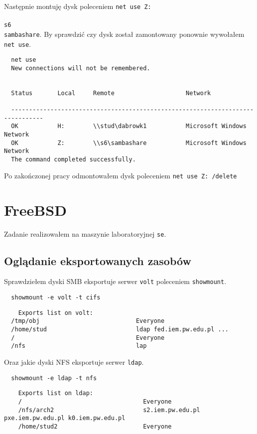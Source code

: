 \documentclass{article} %
\begin{document}
Następnie montuję dysk poleceniem \texttt{net use Z: \\\\s6\\sambashare}.
By sprawdzić czy dysk został zamontowany ponownie wywołałem \texttt{net use}.
\begin{verbatim}
  net use
  New connections will not be remembered.


  Status       Local     Remote                    Network

  -------------------------------------------------------------------------------
  OK           H:        \\stud\dabrowk1           Microsoft Windows Network
  OK           Z:        \\s6\sambashare           Microsoft Windows Network
  The command completed successfully.
\end{verbatim}

Po zakończonej pracy odmontowałem dysk poleceniem \texttt{net use Z: /delete}

\section{FreeBSD}
Zadanie realizowałem na maszynie laboratoryjnej \texttt{se}.

\subsection{Oglądanie eksportowanych zasobów}
Sprawdziełem dyski SMB eksportuje serwer \texttt{volt} poleceniem \texttt{showmount}.

\begin{tcolorbox}[colback=yellow!10!white,colframe=red!45!black,coltitle=yellow!100!black, title=FreeBSD]
  \begin{lstlisting}
  showmount -e volt -t cifs
  \end{lstlisting}
  \tcblower
  \tiny
  \begin{lstlisting}
    Exports list on volt:
  /tmp/obj                           Everyone
  /home/stud                         ldap fed.iem.pw.edu.pl ...
  /                                  Everyone
  /nfs                               lap
  \end{lstlisting}
\end{tcolorbox}
\normalsize

\vspace{1cm}
Oraz jakie dyski NFS eksportuje serwer \texttt{ldap}.
\begin{tcolorbox}[colback=yellow!10!white,colframe=red!45!black,coltitle=yellow!100!black, title=FreeBSD]
  \begin{lstlisting}
  showmount -e ldap -t nfs
  \end{lstlisting}
  \tcblower
  \tiny
  \begin{lstlisting}
    Exports list on ldap:
    /                                  Everyone
    /nfs/arch2                         s2.iem.pw.edu.pl pxe.iem.pw.edu.pl k0.iem.pw.edu.pl  
    /home/stud2                        Everyone
  \end{lstlisting}
\end{tcolorbox}
\normalsize
\end{document}
